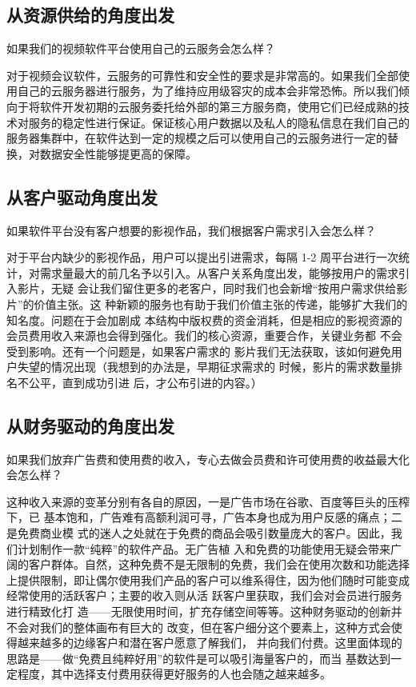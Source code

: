 \documentclass[a4paper,12pt]{article}
\begin{document}
    \subsection{从资源供给的角度出发}
    如果我们的视频软件平台使用自己的云服务会怎么样？

    对于视频会议软件，云服务的可靠性和安全性的要求是非常高的。如果我们全部使用自己的云服务器进行服务，为了维持应用级容灾的成本会非常恐怖。所以我们倾向于将软件开发初期的云服务委托给外部的第三方服务商，使用它们已经成熟的技术对服务的稳定性进行保证。保证核心用户数据以及私人的隐私信息在我们自己的服务器集群中，在软件达到一定的规模之后可以使用自己的云服务进行一定的替换，对数据安全性能够提更高的保障。

    \subsection{从客户驱动角度出发}
    如果软件平台没有客户想要的影视作品，我们根据客户需求引入会怎么样？

    对于平台内缺少的影视作品，用户可以提出引进需求，每隔 1-2 周平台进行一次统计，对需求量最大的前几名予以引入。从客户关系角度出发，能够按用户的需求引入影片，无疑 会让我们留住更多的老客户，同时我们也会新增“按用户需求供给影片”的价值主张。这 种新颖的服务也有助于我们价值主张的传递，能够扩大我们的知名度。问题在于会加剧成 本结构中版权费的资金消耗，但是相应的影视资源的会员费用收入来源也会得到强化。我们的核心资源，重要合作，关键业务都 不会受到影响。还有一个问题是，如果客户需求的 影片我们无法获取，该如何避免用户失望的情况出现（我想到的办法是，早期征求需求的 时候，影片的需求数量排名不公平，直到成功引进 后，才公布引进的内容。）

    \subsection{从财务驱动的角度出发}
    如果我们放弃广告费和使用费的收入，专心去做会员费和许可使用费的收益最大化会怎么样？

    这种收入来源的变革分别有各自的原因，一是广告市场在谷歌、百度等巨头的压榨下，已 基本饱和，广告难有高额利润可寻，广告本身也成为用户反感的痛点；二是免费商业模 式的迷人之处就在于免费的商品会吸引数量庞大的客户。因此，我们计划制作一款“纯粹”的软件产品。无广告植 入和免费的功能使用无疑会带来广阔的客户群体。自然，这种免费不是无限制的免费，我们会在使用次数和功能选择上提供限制，即让偶尔使用我们产品的客户可以维系得住，因为他们随时可能变成经常使用的活跃客户；主要的收入则从活 跃客户里获取，我们会对会员进行服务进行精致化打 造——无限使用时间，扩充存储空间等等。这种财务驱动的创新并不会对我们的整体画布有巨大的 改变，但在客户细分这个要素上，这种方式会使得越来越多的边缘客户和潜在客户愿意了解我们， 并向我们付费。这里面体现的思路是——做“免费且纯粹好用”的软件是可以吸引海量客户的，而当 基数达到一定程度，其中选择支付费用获得更好服务的人也会随之越来越多。
\end{document}
